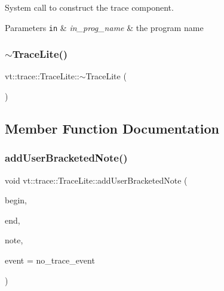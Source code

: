 System call to construct the trace component. 


\begin{DoxyParams}[1]{Parameters}
\mbox{\tt in}  & {\em in\+\_\+prog\+\_\+name} & the program name \\
\hline
\end{DoxyParams}
\mbox{\label{structvt_1_1trace_1_1_trace_lite_a08eca22659dc1f361d534c2b9c03b90b}} 
\subsubsection{\texorpdfstring{$\sim$\+Trace\+Lite()}{~TraceLite()}}
{\footnotesize\ttfamily vt\+::trace\+::\+Trace\+Lite\+::$\sim$\+Trace\+Lite (\begin{DoxyParamCaption}{ }\end{DoxyParamCaption})\hspace{0.3cm}{\ttfamily [virtual]}}



\subsection{Member Function Documentation}
\mbox{\label{structvt_1_1trace_1_1_trace_lite_aa45597cc7a0dfee2ed21cda1c009613a}} 
\subsubsection{\texorpdfstring{add\+User\+Bracketed\+Note()}{addUserBracketedNote()}}
{\footnotesize\ttfamily void vt\+::trace\+::\+Trace\+Lite\+::add\+User\+Bracketed\+Note (\begin{DoxyParamCaption}\item[{\hyperlink{namespacevt_a2b9f28078dc309ad0706b69ded743e69}{Time\+Type} const}]{begin,  }\item[{\hyperlink{namespacevt_a2b9f28078dc309ad0706b69ded743e69}{Time\+Type} const}]{end,  }\item[{std\+::string const \&}]{note,  }\item[{\hyperlink{namespacevt_1_1trace_a64a7185f3e102df8d8258f263ccd1582}{Trace\+Event\+I\+D\+Type} const}]{event = {\ttfamily no\+\_\+trace\+\_\+event} }\end{DoxyParamCaption})}



